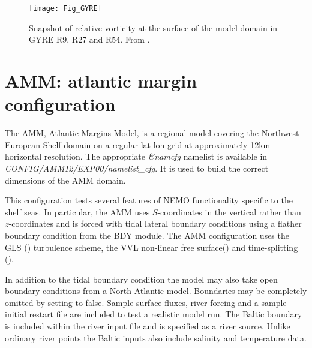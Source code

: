 \documentclass[../main/NEMO_manual]{subfiles}
\begin{document}
\begin{figure}[!t]
  \begin{center}
    \texttt{[image: Fig\_GYRE]}
    \caption{
      \protect\label{fig:GYRE}
      Snapshot of relative vorticity at the surface of the model domain in GYRE R9, R27 and R54.
      From \citet{Levy_al_OM10}.
    }
  \end{center}
\end{figure}

\section{AMM: atlantic margin configuration}
\label{sec:MISC_config_AMM}

The AMM, Atlantic Margins Model, is a regional model covering the Northwest European Shelf domain on
a regular lat-lon grid at approximately 12km horizontal resolution.
The appropriate \textit{\&namcfg} namelist  is available in \textit{CONFIG/AMM12/EXP00/namelist\_cfg}.
It is used to build the correct dimensions of the AMM domain.

This configuration tests several features of NEMO functionality specific to the shelf seas.
In particular, the AMM uses $S$-coordinates in the vertical rather than $z$-coordinates and
is forced with tidal lateral boundary conditions using a flather boundary condition from the BDY module.
The AMM configuration uses the GLS () turbulence scheme,
the VVL non-linear free surface() and time-splitting ().

In addition to the tidal boundary condition the model may also take open boundary conditions from
a North Atlantic model.
Boundaries may be completely omitted by setting  to false.
Sample surface fluxes, river forcing and a sample initial restart file are included to test a realistic model run.
The Baltic boundary is included within the river input file and is specified as a river source.
Unlike ordinary river points the Baltic inputs also include salinity and temperature data.

\biblio

\pindex
\end{document}
